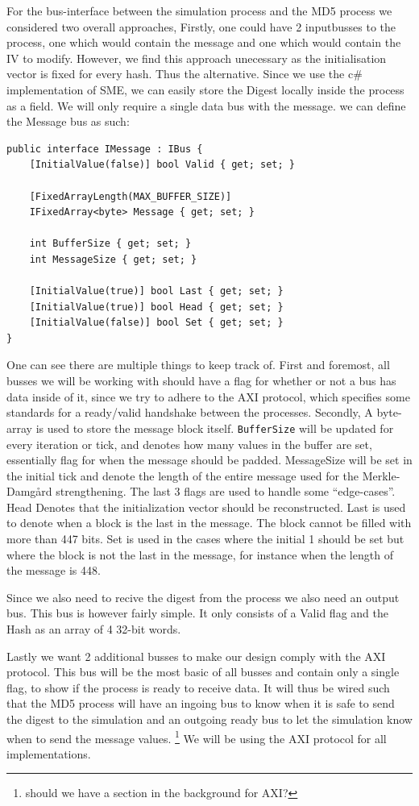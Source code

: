 \documentclass[a4paper]{article}
\begin{document}
For the bus-interface between the simulation process and the MD5 process we considered two overall approaches,
Firstly, one could have 2 inputbusses to the process, one which would contain the message and one which would contain the IV to modify. However, we find this approach unecessary as the initialisation vector is fixed for every hash. Thus the alternative. Since we use the c\# implementation of SME, we can easily store the Digest locally inside the process as a field. We will only require a single data bus with the message. we can define the Message bus as such:
\begin{verbatim}
public interface IMessage : IBus {
    [InitialValue(false)] bool Valid { get; set; }

    [FixedArrayLength(MAX_BUFFER_SIZE)]
    IFixedArray<byte> Message { get; set; }

    int BufferSize { get; set; }
    int MessageSize { get; set; }

    [InitialValue(true)] bool Last { get; set; }
    [InitialValue(true)] bool Head { get; set; }
    [InitialValue(false)] bool Set { get; set; }
}
\end{verbatim}
One can see there are multiple things to keep track of. First and foremost, all busses we will be working with should have a flag for whether or not a bus has data inside of it, since we try to adhere to the AXI protocol, which specifies some standards for a ready/valid handshake between the processes. Secondly, A byte-array is used to store the message block itself. \texttt{BufferSize} will be updated for every iteration or tick, and denotes how many values in the buffer are set, essentially flag for when the message should be padded. MessageSize will be set in the initial tick and denote the length of the entire message used for the Merkle-Damgård strengthening.
The last 3 flags are used to handle some ``edge-cases''.
Head Denotes that the initialization vector should be reconstructed.
Last is used to denote when a block is the last in the message. The block cannot be filled with more than 447 bits.
Set is used in the cases where the initial 1 should be set but where the block is not the last in the message, for instance when the length of the message is 448.

Since we also need to recive the digest from the process we also need an output bus. This bus is however fairly simple. It only consists of a Valid flag and the Hash as an array of 4 32-bit words.

Lastly we want 2 additional busses to make our design comply with the AXI protocol. This bus will be the most basic of all busses and contain only a single flag, to show if the process is ready to receive data. It will thus be wired such that the MD5 process will have an ingoing bus to know when it is safe to send the digest to the simulation and an outgoing ready bus to let the simulation know when to send the message values. \footnote{should we have a section in the background for AXI?} We will be using the AXI protocol for all implementations.
\end{document}
